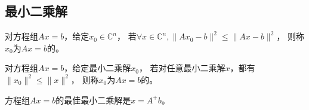\subsection{最小二乘解}

\begin{definition}[最小二乘解]
    对方程组$Ax=b$，给定$x_0\in\mathbb{C}^n$，
    若$\forall x\in \mathbb{C}^{n}, \|Ax_0-b\|^2\leq \|Ax-b\|^2$，
    则称$x_0$为$Ax=b$的。
\end{definition}

\begin{definition}[最佳最小二乘解]
    对方程组$Ax=b$，给定最小二乘解$x_0$，
    若对任意最小二乘解$x$，都有$\|x_0\|^2\leq \|x\|^2$，
    则称$x_0$为$Ax=b$的。
\end{definition}

\begin{theorem}
    方程组$Ax=b$的最佳最小二乘解是$x=A^+ b$。
\end{theorem}
